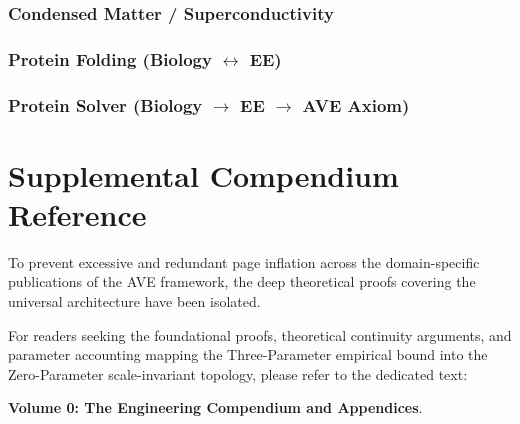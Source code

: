 \subsection{Condensed Matter / Superconductivity}


\subsection{Protein Folding (Biology $\leftrightarrow$ EE)}


\subsection{Protein Solver (Biology $\to$ EE $\to$ AVE Axiom)}


\chapter{Supplemental Compendium Reference}
\label{app:compendium_reference}

To prevent excessive and redundant page inflation across the domain-specific publications of the AVE framework, the deep theoretical proofs covering the universal architecture have been isolated. 

For readers seeking the foundational proofs, theoretical continuity arguments, and parameter accounting mapping the Three-Parameter empirical bound into the Zero-Parameter scale-invariant topology, please refer to the dedicated text:

\vspace{1em}
\noindent \textbf{Volume 0: The Engineering Compendium and Appendices}. 
\vspace{1em}

